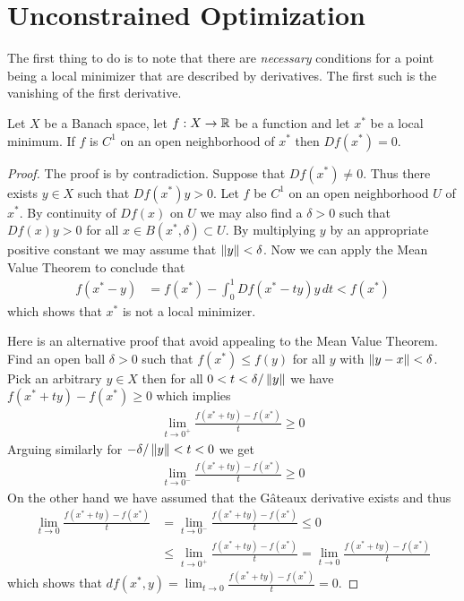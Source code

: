 \section{Unconstrained Optimization}

The first thing to do is to note that there are \emph{necessary}
conditions for a point being a local minimizer that are described by
derivatives.  The first such is the vanishing of the first derivative.

\begin{thm}\label{VanishingFirstDerivativeAtLocalMinimum}Let $X$ be a
  Banach space, let $f : X \to \mathbb{R}$ be a function and let $x^*$ be
  a local minimum.  If $f$ is $C^1$ on an open neighborhood of $x^*$
  then $Df(x^*) = 0$.
\end{thm}
\begin{proof}
The proof is by contradiction.  Suppose that $Df(x^*) \neq 0$.  Thus
there exists $y \in X$ such that $Df(x^*)y > 0$.  Let $f$ be $C^1$ on
an open neighborhood $U$ of $x^*$.  By continuity of $Df(x)$ on $U$ we
may also find a $\delta > 0$ such that $Df(x) y > 0$ for all $x \in
B(x^*, \delta) \subset U$.  By multiplying $y$ by an
appropriate positive constant we may assume that $\left \lVert y \right \rVert < \delta$.  Now we can
apply the Mean Value Theorem \label{MeanValueTheoremBanachSpaces} to conclude that 
\begin{align*}
f(x^* - y) &= f(x^*) - \int_0^1 Df(x^*-ty) y \, dt < f(x^*)
\end{align*}
which shows that $x^*$ is not a local minimizer.

Here is an alternative proof that avoid appealing to the Mean Value Theorem.
Find an open ball $\delta > 0$ such that $f(x^*) \leq f(y)$
for all $y$ with $\left \lVert y - x \right \rVert < \delta$.  Pick an arbitrary $y \in X$
then for all $0 < t < \delta/\left \lVert y \right \rVert$ we have $f(x^* + t y) - f(x^*)
\geq 0$ which implies 
\begin{align*}
\lim_{t \to 0^+} \frac{f(x^* + ty) - f(x^*)}{t} \geq 0
\end{align*}
Arguing similarly for $- \delta/\left \lVert y \right \rVert<t<0$ we get
\begin{align*}
\lim_{t \to 0^-} \frac{f(x^* + ty) - f(x^*)}{t} \geq 0
\end{align*}
On the other hand we have assumed that the  G\^{a}teaux derivative exists and thus
\begin{align*}
\lim_{t \to 0} \frac{f(x^* + ty) - f(x^*)}{t} &= \lim_{t \to 0^-} \frac{f(x^* + ty) - f(x^*)}{t} \leq 0 \\
&\leq \lim_{t \to 0^+} \frac{f(x^* + ty) - f(x^*)}{t} = \lim_{t \to 0} \frac{f(x^* + ty) - f(x^*)}{t}
\end{align*}
which shows that $df(x^*, y) = \lim_{t \to 0} \frac{f(x^* + ty) - f(x^*)}{t} = 0$. 


\end{proof}
